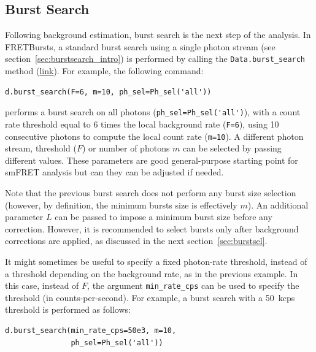 \documentclass[10pt,letterpaper]{article}
\begin{document}
\subsection{Burst Search}
\label{sec:burstsearch}


Following background estimation, burst search is the next step of
the analysis.
In FRETBursts, a standard burst search using a single photon stream
(see section~\ref{sec:burstsearch_intro}) is performed by calling the
\verb|Data.burst_search| method
(\href{http://fretbursts.readthedocs.org/en/latest/data_class.html#fretbursts.burstlib.Data.burst_search}{link}).
For example, the following command:

\begin{lstlisting}
d.burst_search(F=6, m=10, ph_sel=Ph_sel('all'))
\end{lstlisting}

performs a burst search on all photons
(\verb|ph_sel=Ph_sel('all')|), with a count rate threshold equal to 6 times the
local background rate (\verb|F=6|), using 10 consecutive photons to compute the
local count rate (\verb|m=10|).
A different photon stream, threshold ($F$) or number of photons $m$ can be selected
by passing different values.
These parameters are good general-purpose starting point for smFRET analysis
but can they can be adjusted if needed.

Note that the previous burst search does not perform any burst size selection
(however, by definition, the minimum bursts size is effectively $m$).
An additional parameter $L$ can be passed to impose a minimum burst
size before any correction.
However, it is recommended to select bursts only after background corrections
are applied, as discussed in the next section~\ref{sec:burstsel}.

It might sometimes be useful to specify a fixed photon-rate threshold, instead
of a threshold depending on the background rate, as in the previous example. In
this case, instead of $F$, the argument \verb|min_rate_cps| can be used to
specify the threshold (in counts-per-second). For example, a burst search with
a 50~kcps threshold is performed as follows:

\begin{lstlisting}
d.burst_search(min_rate_cps=50e3, m=10,
               ph_sel=Ph_sel('all'))
\end{lstlisting}
\end{document}
